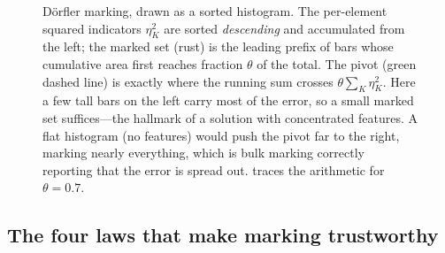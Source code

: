 \begin{figure}[t]
\centering
{}
\caption[D\"orfler bulk marking on a sorted histogram]{D\"orfler marking, drawn as a
sorted histogram. The per-element squared indicators $\eta_K^2$ are sorted
\emph{descending} and accumulated from the left; the marked set (rust) is the leading
prefix of bars whose cumulative area first reaches fraction $\theta$ of the total. The
pivot (green dashed line) is exactly where the running sum crosses $\theta\sum_K
\eta_K^2$. Here a few tall bars on the left carry most of the error, so a small marked
set suffices---the hallmark of a solution with concentrated features. A flat
histogram (no features) would push the pivot far to the right, marking nearly
everything, which is bulk marking correctly reporting that the error is spread out.
 traces the arithmetic for $\theta = 0.7$.}
\label{fig:dorfler-hist}
\end{figure}

\subsection{The four laws that make marking trustworthy}

